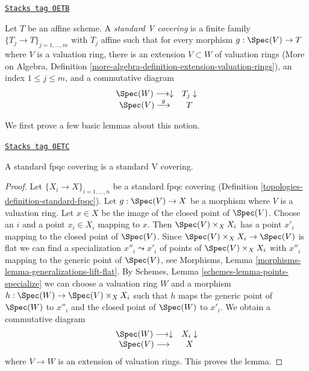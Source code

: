 \begin{definition}
\label{topologies-definition-standard-V-covering}
\href{https://stacks.math.columbia.edu/tag/0ETB}{\texttt{Stacks tag 0ETB}}

Let $T$ be an affine scheme. A {\it standard V covering} is a finite family
$\{T_j \to T\}_{j = 1, \ldots, m}$ with $T_j$ affine
such that for every morphism $g : \Spec(V) \to T$ where $V$
is a valuation ring, there is an extension $V \subset W$ of valuation rings
(More on Algebra, Definition
\ref{more-algebra-definition-extension-valuation-rings}),
an index $1 \leq j \leq m$, and a commutative diagram
$$
\begin{array}{cc}\Spec(W) \longrightarrow\downarrow & T_j \downarrow \\ \Spec(V) \overset{g}{\longrightarrow} & T\end{array}
$$
\end{definition}

We first prove a few basic lemmas about this notion.

\begin{lemma}
\label{topologies-lemma-standard-fpqc-standard-V}
\href{https://stacks.math.columbia.edu/tag/0ETC}{\texttt{Stacks tag 0ETC}}

A standard fpqc covering is a standard V covering.
\end{lemma}

\begin{proof}

Let $\{X_i \to X\}_{i = 1, \ldots, n}$ be a standard fpqc covering
(Definition \ref{topologies-definition-standard-fpqc}). Let $g : \Spec(V) \to X$
be a morphism where $V$ is a valuation ring. Let $x \in X$ be the
image of the closed point of $\Spec(V)$. Choose an $i$ and a point
$x_i \in X_i$ mapping to $x$. Then $\Spec(V) \times_X X_i$
has a point $x'_i$ mapping to the closed point of $\Spec(V)$.
Since $\Spec(V) \times_X X_i \to \Spec(V)$ is flat
we can find a specialization $x''_i \leadsto x'_i$ of
points of $\Spec(V) \times_X X_i$ with $x''_i$ mapping to
the generic point of $\Spec(V)$, see
Morphisms, Lemma \ref{morphisms-lemma-generalizations-lift-flat}. By
Schemes, Lemma \ref{schemes-lemma-points-specialize}
we can choose a valuation ring $W$ and a morphism
$h : \Spec(W) \to \Spec(V) \times_X X_i$ such that $h$
maps the generic point of $\Spec(W)$ to $x''_i$ and the
closed point of $\Spec(W)$ to $x'_i$. We obtain a
commutative diagram
$$
\begin{array}{cc}\Spec(W) \longrightarrow\downarrow & X_i \downarrow \\ \Spec(V) \longrightarrow & X\end{array}
$$
where $V \to W$ is an extension of valuation rings.
This proves the lemma.
\end{proof}

